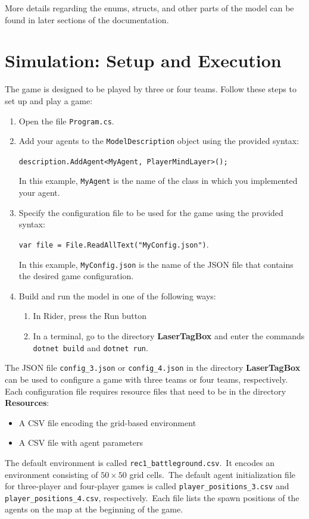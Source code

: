 \documentclass[
  a4paper,
  english,
  DIV=16,
  11pt,
  parskip=half,
  dvipsnames,
  listof=totoc,		     %
  index=totoc,		     %
  bibliography=totoc,	 %
]{scrartcl}
\begin{document}
More details regarding the enums, structs, and other parts of the model can be found in later sections of the documentation.
%
\section{Simulation: Setup and Execution} \label{sec:simSetup}
%
The game is designed to be played by three or four teams. Follow these steps to set up and play a game:
\begin{enumerate}
  \item Open the file \texttt{Program.cs}.
  \item Add your agents to the \texttt{ModelDescription} object using the provided syntax:%
  \begin{center}
    \texttt{description.AddAgent<MyAgent, PlayerMindLayer>();}
  \end{center}%
  In this example, \texttt{MyAgent} is the name of the class in which you implemented your agent.
  \item Specify the configuration file to be used for the game using the provided syntax:%
  \begin{center}
    \texttt{var file = File.ReadAllText("MyConfig.json")}.
  \end{center}%
  In this example, \texttt{MyConfig.json} is the name of the JSON file that contains the desired game configuration.
  \item Build and run the model in one of the following ways:%
  \begin{enumerate}
    \item In Rider, press the \textcolor{OliveGreen}{\Forward} Run button
    \item In a terminal, go to the directory \textbf{LaserTagBox} and enter the commands \texttt{dotnet build} and \texttt{dotnet run}.
  \end{enumerate}%
\end{enumerate}
%
The JSON file \texttt{config\_3.json} or \texttt{config\_4.json} in the directory \textbf{LaserTagBox} can be used to configure a game with three teams or four teams, respectively. Each configuration file requires resource files that need to be in the directory \textbf{Resources}:%
%
\begin{itemize}
  \item A CSV file encoding the grid-based environment
  \item A CSV file with agent parameters
\end{itemize}
%
The default environment is called \texttt{rec1\_battleground.csv}.~It encodes an environment consisting of $50\times 50$ grid cells.~The default agent initialization file for three-player and four-player games is called \texttt{player\_positions\_3.csv} and \texttt{player\_positions\_4.csv}, respectively.~Each file lists the spawn positions of the agents on the map at the beginning of the game.
%
\end{document}

